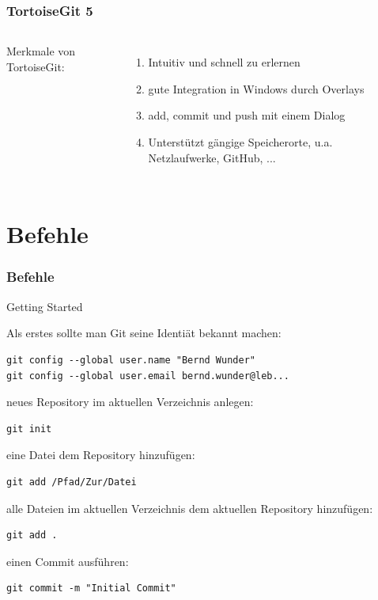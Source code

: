 \documentclass{beamer}
\begin{document}
\begin{frame}\frametitle{TortoiseGit 5}

\begin{columns}
        Merkmale von TortoiseGit:
                \begin{enumerate}
                \item Intuitiv und schnell zu erlernen
                \item gute Integration in Windows durch Overlays
                \item add, commit und push mit einem Dialog
                \item Unterstützt gängige Speicherorte, u.a. Netzlaufwerke, GitHub, ...
                \end{enumerate}
\end{columns}
\end{frame}

\section{Befehle}

\begin{frame}[fragile]\frametitle{Befehle}
\begin{block} {Getting Started}
\begin{tiny}
Als erstes sollte man Git seine Identiät bekannt machen:
\begin{lstlisting}
git config --global user.name "Bernd Wunder"
git config --global user.email bernd.wunder@leb...
\end{lstlisting}

neues Repository im aktuellen Verzeichnis anlegen:
\begin{lstlisting}
git init
\end{lstlisting}
%

eine Datei dem Repository hinzufügen:
\begin{lstlisting}
git add /Pfad/Zur/Datei
\end{lstlisting}

alle Dateien im aktuellen Verzeichnis dem aktuellen Repository hinzufügen:
\begin{lstlisting}
git add .
\end{lstlisting}

einen Commit ausführen:
\begin{lstlisting}
git commit -m "Initial Commit"
\end{lstlisting}
\end{tiny}
\end{block}
\end{frame}
\end{document}
